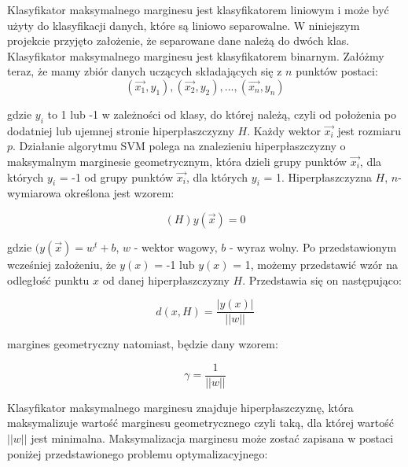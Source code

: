 \documentclass[[10pt,a4paper]{article}
\begin{document}
Klasyfikator maksymalnego marginesu jest klasyfikatorem liniowym i może być użyty do klasyfikacji danych, które są liniowo separowalne. W niniejszym projekcie przyjęto założenie, że separowane dane należą do dwóch klas. Klasyfikator maksymalnego marginesu jest klasyfikatorem binarnym.
Załóżmy teraz, że mamy zbiór danych uczących składających się z $n$ punktów postaci:
\newpage
\begin{equation}
 (\overrightarrow{x_1}, y_1),(\overrightarrow{x_2}, y_2),...,(\overrightarrow{x_n}, y_n)
\end{equation}

\vspace{5mm}
gdzie $y_i$ to 1 lub -1 w zależności od klasy, do której należą, czyli od położenia po dodatniej lub ujemnej stronie hiperpłaszczyzny $H$. Każdy wektor $\overrightarrow{x_i}$ jest rozmiaru $p$. Działanie algorytmu SVM polega na znalezieniu hiperpłaszczyzny  o maksymalnym marginesie geometrycznym, która dzieli grupy punktów $\overrightarrow{x_i}$, dla których $y_i$ = -1 od grupy punktów  $\overrightarrow{x_i}$, dla których $y_i$ = 1.
Hiperpłaszczyzna $H$, $n$-wymiarowa określona jest wzorem:

\vspace{5mm}
\begin{equation}
(H)y(\overrightarrow{x}) = 0
\end{equation}

\vspace{5mm}
gdzie $(y(\overrightarrow{x}) = w^t + b$, $w$ - wektor wagowy, $b$ - wyraz wolny. 
Po przedstawionym wcześniej założeniu, że $y(x)$ = -1 lub $y(x)$ = 1, możemy przedstawić wzór na odległość punktu $x$ od danej hiperpłaszczyzny $H$. Przedstawia się on następująco:

\vspace{5mm}
\begin{equation}
d(x,H) = \frac{|y(x)|}{||w||}
\end{equation}

\vspace{5mm}margines geometryczny natomiast, będzie dany wzorem:

\vspace{5mm}
\begin{equation}
\gamma = \frac{1}{||w||}
\end{equation}

\vspace{5mm}Klasyfikator maksymalnego marginesu znajduje hiperpłaszczyznę, która maksymalizuje wartość marginesu geometrycznego czyli taką, dla której wartość  $||w||$ jest minimalna. 
Maksymalizacja marginesu może zostać zapisana w postaci poniżej przedstawionego problemu optymalizacyjnego:
\end{document}
